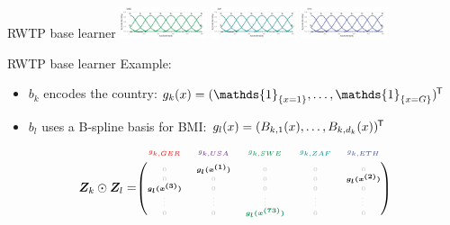 \documentclass[t,10pt]{beamer}
\begin{document}
\begin{frame}{RWTP base learner}
  {\includegraphics[width=0.19\textwidth]{figures/fig-bs0-SWE.png}}
  {\includegraphics[width=0.19\textwidth]{figures/fig-bs0-ZAF.png}}
  {\includegraphics[width=0.19\textwidth]{figures/fig-bs0-ETH.png}}
  \addtocounter{framenumber}{-1}
\end{frame}

\begin{frame}{RWTP base learner}
  Example:
  \begin{itemize}
    \item $b_k$ encodes the country: $g_k(x) = (\mathds{1}_{\{x = 1\}}, \dots, \mathds{1}_{\{x = G\}})^\tran$
    \item $b_l$ uses a B-spline basis for BMI: $g_l(x) = (B_{k,1}(x), \dots, B_{k,d_k}(x))^\tran$
  \end{itemize}
  $$
    \design_k \odot \design_l = \tiny\begin{blockarray}{ccccc}
      \color[HTML]{EE0000}g_{k,GER} & \color[HTML]{631879}g_{k,USA} & \color[HTML]{008B45}g_{k,SWE} & \color[HTML]{008280}g_{k,ZAF} & \color[HTML]{3B4992}g_{k,ETH}\\
    \begin{block}{(ccccc)}
      \phantom{x}\\
      \color{lightgray}0 & \color{black}\bm{g_l(x^{(1)})} & \color{lightgray}0 & \color{lightgray}0 & \color{lightgray}0 \\
      \color{lightgray}0 & \color{lightgray}0 & \color{lightgray}0 & \color{lightgray}0 & \color{black}\bm{g_l(x^{(2)})} \\
      \color{black}\bm{g_l(x^{(3)})} & \color{lightgray}0 & \color{lightgray}0 & \color{lightgray}0 & \color{lightgray}0 \\
      \color{lightgray}\vdots & \color{lightgray}\vdots & \color{lightgray}\vdots & \color{lightgray}\vdots & \color{lightgray}\vdots \\
      \color{lightgray}0 & \color{lightgray}0 & \color[HTML]{008B45}\bm{g_l(x^{(73)})} & \color{lightgray}0 & \color{lightgray}0 \\

\end{block}
\end{blockarray}$$
\end{frame}
\end{document}
